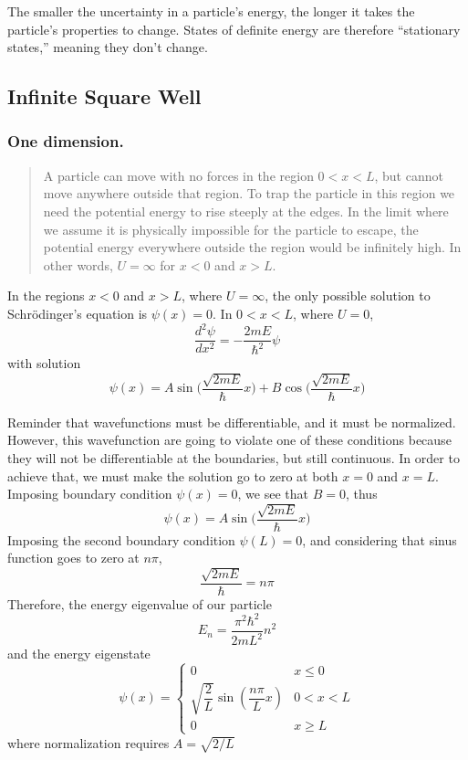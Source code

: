 \documentclass[../main.tex]{subfiles}
\begin{document}
The smaller the uncertainty in a particle's energy, the longer it takes the particle's properties to change. States of definite energy are therefore “stationary states,” meaning they don't change.

\subsection*{Infinite Square Well}
\subsubsection*{One dimension.} \begin{quote}
    A particle can move with no forces in the region $0 < x < L$, but cannot move anywhere outside that region. To trap the particle in this region we need the potential energy to rise steeply at the edges. In the limit where we assume it is physically impossible for the particle to escape, the potential energy everywhere outside the region would be infinitely high. In other words, $U=\infty$ for $x < 0$ and $x > L$.
\end{quote} 
In the regions $x < 0$ and $x > L$, where $U = \infty$, the only possible solution to Schrödinger's equation is $\psi(x) = 0$. In $0 < x < L$, where $ U = 0$, 
\begin{equation*}
    \frac{d^2\psi}{dx^2}=-\frac{2mE}{\hbar^2}\psi
\end{equation*}
with solution
\begin{equation*}
    \psi(x)=A\sin \biggl(\frac{\sqrt{2mE}}{\hbar} x\biggr)+ B \cos \biggl(\frac{\sqrt{2mE}}{\hbar} x\biggr)
\end{equation*}

Reminder that wavefunctions must be differentiable, and it must be normalized. However, this wavefunction are going to violate one of these conditions because they will not be differentiable at the boundaries, but still continuous. In order to achieve that, we must make the solution go to zero at both $x = 0$ and $x = L$. Imposing boundary condition $\psi(x)=0$, we see that $B=0$, thus
\begin{equation*}
    \psi(x)=A\sin \biggl(\frac{\sqrt{2mE}}{\hbar} x\biggr)
\end{equation*}
Imposing the second boundary condition $\psi(L)=0$, and considering that sinus function goes to zero at $n\pi$, 
\begin{equation*}
    \frac{\sqrt{2mE}}{\hbar}=n\pi
\end{equation*}
Therefore, the energy eigenvalue of our particle 
\begin{equation*}
    E_n=\frac{\pi^2\hbar^2}{2mL^2}n^2
\end{equation*}
and the energy eigenstate
\begin{equation*}
    \psi(x)=\begin{cases}
        0&x\leq 0\\
        \sqrt{\dfrac{2}{L}}\sin( \dfrac{n\pi}{L}x)& 0 < x < L\\
        0&x\geq L
    \end{cases}
\end{equation*}
where normalization requires $A = \sqrt{2/L}$
\end{document}
